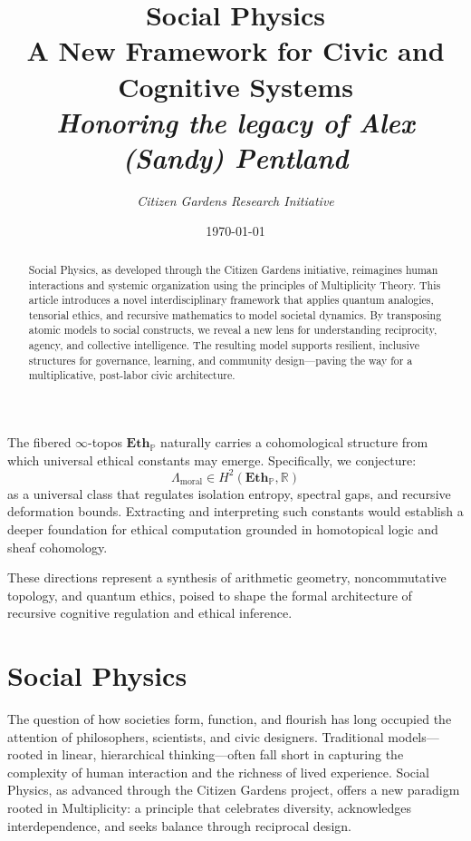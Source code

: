\documentclass{article}
\theoremstyle{plain}
\theoremstyle{claimstyle}
\begin{document}
The fibered $\infty$-topos $\mathbf{Eth}_{\mathbb{P}}$ naturally carries a cohomological structure from which universal ethical constants may emerge. Specifically, we conjecture:
\[
\Lambda_{\mathrm{moral}} \in H^2(\mathbf{Eth}_{\mathbb{P}}, \mathbb{R})
\]
as a universal class that regulates isolation entropy, spectral gaps, and recursive deformation bounds. Extracting and interpreting such constants would establish a deeper foundation for ethical computation grounded in homotopical logic and sheaf cohomology.

These directions represent a synthesis of arithmetic geometry, noncommutative topology, and quantum ethics, poised to shape the formal architecture of recursive cognitive regulation and ethical inference.


\newpage
\title{Social Physics\\ \large A New Framework for Civic and Cognitive Systems\\ \large \textit{Honoring the legacy of Alex (Sandy) Pentland}}
\author{\textit {Citizen Gardens Research Initiative}}
\date{\today}

\maketitle

\begin{abstract}
Social Physics, as developed through the Citizen Gardens initiative, reimagines human interactions and systemic organization using the principles of Multiplicity Theory. This article introduces a novel interdisciplinary framework that applies quantum analogies, tensorial ethics, and recursive mathematics to model societal dynamics. By transposing atomic models to social constructs, we reveal a new lens for understanding reciprocity, agency, and collective intelligence. The resulting model supports resilient, inclusive structures for governance, learning, and community design—paving the way for a multiplicative, post-labor civic architecture.
\end{abstract}

\section{Social Physics}

The question of how societies form, function, and flourish has long occupied the attention of philosophers, scientists, and civic designers. Traditional models—rooted in linear, hierarchical thinking—often fall short in capturing the complexity of human interaction and the richness of lived experience. Social Physics, as advanced through the Citizen Gardens project, offers a new paradigm rooted in Multiplicity: a principle that celebrates diversity, acknowledges interdependence, and seeks balance through reciprocal design.
\end{document}
